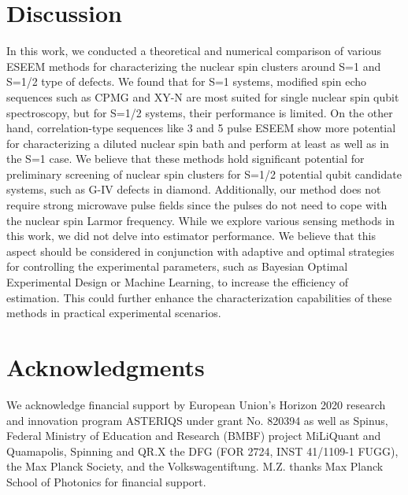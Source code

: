\documentclass[%
 reprint,
superscriptaddress,
 amsmath,amssymb,
 aps,
]{revtex4-2}
\begin{document}
\section{Discussion}

In this work, we conducted a theoretical and numerical comparison of various ESEEM methods for characterizing the nuclear spin clusters around S=1 and S=1/2 type of defects.
We found that for S=1 systems, modified spin echo sequences such as CPMG and XY-N are most suited for single nuclear spin qubit spectroscopy, but for S=1/2 systems, their performance is limited. On the other hand, correlation-type sequences like 3 and 5 pulse ESEEM show more potential for characterizing a diluted nuclear spin bath and perform at least as well as in the S=1 case.
We believe that these methods hold significant potential for preliminary screening of nuclear spin clusters for S=1/2 potential qubit candidate systems, such as G-IV defects in diamond.
Additionally, our method does not require strong microwave pulse fields since the pulses do not need to cope with the nuclear spin Larmor frequency.
While we explore various sensing methods in this work, we did not delve into estimator performance.
We believe that this aspect should be considered in conjunction with adaptive and optimal strategies for controlling the experimental parameters, such as Bayesian Optimal Experimental Design or Machine Learning, to increase the efficiency of estimation.
This could further enhance the characterization capabilities of these methods in practical experimental scenarios.

\section*{Acknowledgments}
We acknowledge financial support by European Union's Horizon 2020 research and innovation program ASTERIQS under grant No. 820394 as well as Spinus, Federal Ministry of Education and Research (BMBF) project MiLiQuant and Quamapolis, Spinning and QR.X the DFG (FOR 2724, INST 41/1109-1 FUGG), the Max Planck Society, and the Volkswagentiftung. M.Z. thanks Max Planck School of Photonics for financial support.


\appendix
\end{document}
